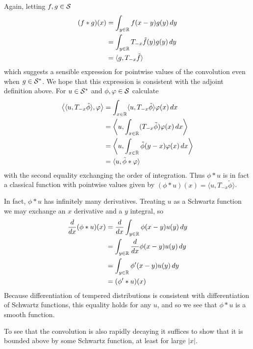     Again, letting $f,g\in\S$
    \begin{align*}
      (f*g)(x)
      &= \int_{y\in\R} f(x-y)g(y)\,dy
      \\&= \int_{y\in\R} T_{-x}\tilde f(y) g(y)\, dy
      \\&= \langle g, T_{-x}\tilde f\rangle
    \end{align*}
    which suggests a sensible expression for pointwise values of the convolution even when $g\in\SS$.
    We hope that this expression is consistent with the adjoint definition above.
    For $u\in\SS$ and $\phi,\varphi\in\S$ calculate
    \begin{align*}
      \left\langle \langle u,T_{-x}\tilde\phi\rangle, \varphi \right\rangle
      &= \int_{x\in\R} \langle u,T_{-x}\tilde\phi\rangle\varphi(x)\,dx
      \\&= \left\langle u, \int_{x\in\R} (T_{-x}\tilde\phi)\varphi(x)\,dx \right\rangle
      \\&= \left\langle u, \int_{x\in\R} \tilde\phi(y-x)\varphi(x)\,dx \right\rangle
      \\&= \langle u, \tilde\phi*\varphi\rangle
    \end{align*}
    with the second equality exchanging the order of integration.
    Thus $\phi*u$ is in fact a classical function with pointwise values given by $(\phi*u)(x)=\langle u, T_{-x}\tilde\phi\rangle$.

    In fact, $\phi*u$ has infinitely many derivatives.
    Treating $u$ as a Schwartz function we may exchange an $x$ derivative and a $y$ integral, so
    \begin{align*}
      \frac{d}{dx} (\phi*u)(x)
      &= \frac{d}{dx} \int_{y\in\R} \phi(x-y)u(y)\,dy
      \\&= \int_{y\in\R} \frac{d}{dx} \phi(x-y)u(y)\,dy
      \\&= \int_{y\in\R} \phi'(x-y)u(y)\,dy
      \\&= (\phi'*u)(x)
    \end{align*}
    Because differentiation of tempered distributions is consistent with differentiation of Schwartz functions, this equality holds for any $u$, and so we see that $\phi*u$ is a smooth function.

    To see that the convolution is also rapidly decaying it suffices to show that it is bounded above by some Schwartz function, at least for large $|x|$.

%      

